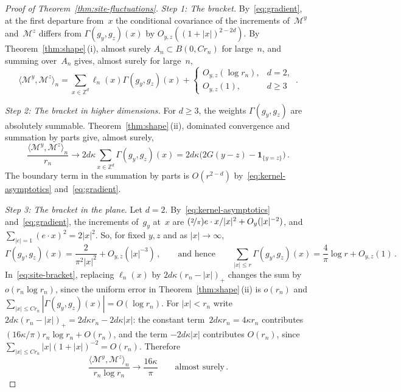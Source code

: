 \documentclass[11pt]{amsart}
\theoremstyle{plain}
\theoremstyle{definition}
\newcommand{\Z}{\mathbb Z}
\newcommand{\drift}{\kappa}
\newcommand{\ind}{\mathbf 1}
\newcommand{\nf}{\nicefrac}
\numberwithin{equation}{section}
\begin{document}
\begin{proof}[Proof of Theorem~\ref{thm:site-fluctuations}]
\emph{Step 1: The bracket.} By~\eqref{eq:gradient}, at the first departure from~$x$ the conditional covariance of the increments of~$\mathcal M^y$ and~$\mathcal M^z$ differs from $\Gamma(g_y,g_z)(x)$ by $O_{y,z}((1+|x|)^{2-2d})$. By Theorem~\ref{thm:shape}\,(i), almost surely $A_n\subset B(0,Cr_n)$ for large~$n$, and summing over~$A_n$ gives, almost surely for large~$n$,
\begin{equation}\label{eq:site-bracket}
\langle\mathcal M^y,\mathcal M^z\rangle_n
=\sum_{x\in\Z^d}\ell_n(x)\Gamma(g_y,g_z)(x)
+\begin{cases}O_{y,z}(\log r_n),&d=2,\\O_{y,z}(1),&d\geq3\end{cases}\, .
\end{equation}

\emph{Step 2: The bracket in higher dimensions.} For $d\geq3$, the weights $\Gamma(g_y,g_z)$ are absolutely summable. Theorem~\ref{thm:shape}\,(ii), dominated convergence and summation by parts give, almost surely,
\begin{equation*}
\frac{\langle\mathcal M^y,\mathcal M^z\rangle_n}{r_n}
\longrightarrow2d\drift\sum_{x\in\Z^d}\Gamma(g_y,g_z)(x)
=2d\drift\bigl(2G(y-z)-\ind_{\{y=z\}}\bigr)\, .
\end{equation*}
The boundary term in the summation by parts is $O(r^{2-d})$ by~\eqref{eq:kernel-asymptotics} and~\eqref{eq:gradient}.

\emph{Step 3: The bracket in the plane.} Let $d=2$. By~\eqref{eq:kernel-asymptotics} and~\eqref{eq:gradient}, the increments of~$g_y$ at~$x$ are $(\nf{2}{\pi})e\cdot x/|x|^2+O_y(|x|^{-2})$, and $\sum_{|e|=1}(e\cdot x)^2=2|x|^2$. So, for fixed $y,z$ and as $|x|\to\infty$,
\begin{equation*}
\Gamma(g_y,g_z)(x)=\frac{2}{\pi^2|x|^2}+O_{y,z}(|x|^{-3})\, ,
\qquad\text{and hence}\qquad
\sum_{|x|\leq r}\Gamma(g_y,g_z)(x)=\frac4\pi\log r+O_{y,z}(1)\, .
\end{equation*}
In~\eqref{eq:site-bracket}, replacing $\ell_n(x)$ by $2d\drift(r_n-|x|)_+$ changes the sum by $o(r_n\log r_n)$, since the uniform error in Theorem~\ref{thm:shape}\,(ii) is $o(r_n)$ and $\sum_{|x|\leq Cr_n}|\Gamma(g_y,g_z)(x)|=O(\log r_n)$. For $|x|<r_n$ write $2d\drift(r_n-|x|)_+=2d\drift r_n-2d\drift|x|$: the constant term~$2d\drift r_n=4\drift r_n$ contributes $(16\drift/\pi)r_n\log r_n+O(r_n)$, and the term $-2d\drift|x|$ contributes $O(r_n)$, since $\sum_{|x|\leq Cr_n}|x|(1+|x|)^{-2}=O(r_n)$. Therefore
\begin{equation*}
\frac{\langle\mathcal M^y,\mathcal M^z\rangle_n}{r_n\log r_n}\longrightarrow\frac{16\drift}{\pi}
\qquad\text{almost surely}\, .
\end{equation*}


\end{proof}
\end{document}

